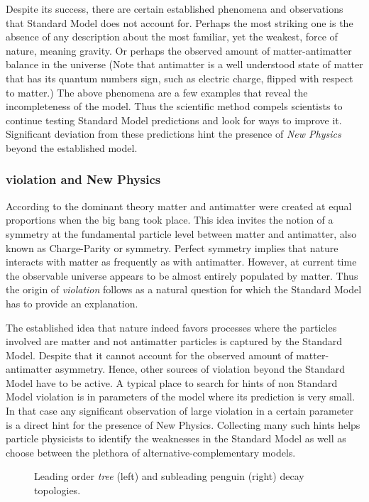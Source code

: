 Despite its success, there are certain established phenomena and observations that Standard
Model does not account for. Perhaps the most striking one is the absence of any description
about the most familiar, yet the weakest, force of nature, meaning gravity. Or perhaps the
observed amount of matter-antimatter balance in the universe \cite{more-cpv-huet,more-cpv-gavela_I,more-cpv-gavela_II}
(Note that antimatter is a well understood state of matter that has its quantum numbers sign,
such as electric charge, flipped with respect to matter.) The above phenomena are a few
examples that reveal the incompleteness of the model. Thus the scientific method compels
scientists to continue testing Standard Model predictions and look for ways to improve it.
Significant deviation from these predictions hint the presence of {\it New Physics}
beyond the established model.

\subsubsection{\CP violation and New Physics}
According to the dominant theory matter and antimatter were created at equal proportions
when the big bang took place. This idea invites the notion of a
symmetry at the fundamental particle level between matter and antimatter, also known as
Charge-Parity or \CP symmetry. Perfect \CP symmetry implies that nature interacts with
matter as frequently as with antimatter. However, at current time the observable universe
appears to be almost entirely populated by matter. Thus the origin of {\it \CP  violation}
follows as a natural question for which the Standard Model has to provide an explanation.

The established idea that nature indeed favors processes where the particles involved
are matter and not antimatter particles is captured by the Standard Model.
Despite that it cannot account for the observed amount of matter-antimatter asymmetry.
Hence, other sources of \CP violation beyond the Standard Model have to be active.
A typical place to search for hints of non Standard Model \CP violation is in parameters
of the model where its prediction is very small. In that case any significant observation
of large \CP violation in a certain parameter is a direct hint for the presence of New Physics.
Collecting many such hints helps particle physicists to identify the weaknesses in the
Standard Model as well as choose between the plethora of alternative-complementary models.


\begin{figure}[t]
  \begin{subfigure}{0.5\textwidth}
    \raggedright
    {\scalebox{1}{\sffamily }}
    \caption{}
    \label{app_jpsiphi_tree}
  \end{subfigure}%
  \hfill
  \begin{subfigure}{0.5\textwidth}
    \raggedleft
    {\scalebox{1}{\sffamily }}
    \caption{}
    \label{app_jpsiphi_peng}
  \end{subfigure}
    \caption{Leading order {\it tree} (left) and subleading penguin (right) \BsJpsiPhi decay topologies.}
  \label{app_jpsiphi_tree_peng}
\end{figure}


